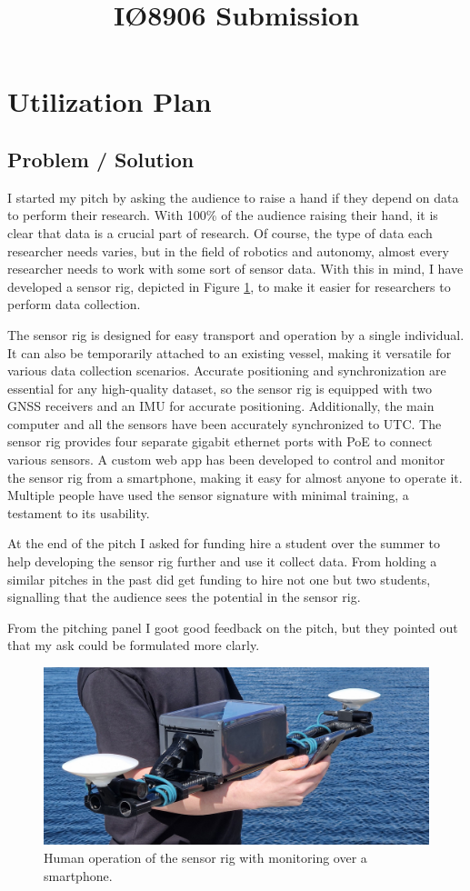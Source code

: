 \documentclass{iopconfser}
\begin{document}
\title{IØ8906 Submission}

\section*{Utilization Plan}
\subsection*{Problem / Solution}
I started my pitch by asking the audience to raise a hand if they depend on data to perform their research.
With 100\% of the audience raising their hand, it is clear that data is a crucial part of research.
Of course, the type of data each researcher needs varies, but in the field of robotics and autonomy, almost every researcher needs to work with some sort of sensor data.
With this in mind, I have developed a sensor rig, depicted in Figure \ref{fig:operation}, to make it easier for researchers to perform data collection.

The sensor rig is designed for easy transport and operation by a single individual. 
It can also be temporarily attached to an existing vessel, making it versatile for various data collection scenarios.
Accurate positioning and synchronization are essential for any high-quality dataset, so the sensor rig is equipped with two GNSS receivers and an IMU for accurate positioning.
Additionally, the main computer and all the sensors have been accurately synchronized to UTC.
The sensor rig provides four separate gigabit ethernet ports with PoE to connect various sensors.
A custom web app has been developed to control and monitor the sensor rig from a smartphone, making it easy for almost anyone to operate it.
Multiple people have used the sensor signature with minimal training, a testament to its usability.

At the end of the pitch I asked for funding hire a student over the summer to help developing the sensor rig further and use it collect data.
From holding a similar pitches in the past did get funding to hire not one but two students, signalling that the audience sees the potential in the sensor rig.

From the pitching panel I goot good feedback on the pitch, but they pointed out that my ask could be formulated more clarly.


\begin{figure}[H]
    \centering
    \includegraphics[trim={0 1cm 0 1cm},clip,width=\textwidth]{figures/operation.jpg}
    \caption{Human operation of the sensor rig with monitoring over a smartphone. \label{fig:operation}}
\end{figure}
\end{document}

